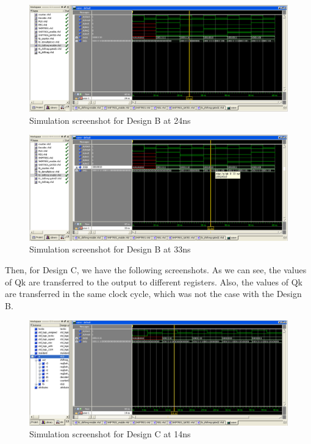 \documentclass[11pt,a4paper]{article}
\begin{document}
\begin{figure}[htp]
\centering
\includegraphics[length = 4in,width = 6.5in]{./images/simsre2.png}
\caption{Simulation screenshot for Design B at 24ns}
\end{figure}

\begin{figure}[htp]
\centering
\includegraphics[length = 4in,width = 6.5in]{./images/simsre3.png}
\caption{Simulation screenshot for Design B at 33ns}
\end{figure}

\newpage
Then, for Design C, we have the following screenshots. As we can see, the values of Qk are transferred to the output to different registers. Also, the values of Qk are transferred in the same clock cycle, which was not the case with the Design B.

\begin{figure}[htp]
\centering
\includegraphics[length = 4in,width = 6.5in]{./images/simsrg1.png}
\caption{Simulation screenshot for Design C at 14ns}
\end{figure}
\end{document}
